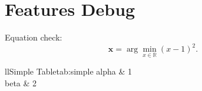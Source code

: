 \documentclass[12pt]{article}
\begin{document}
\section{Features Debug}

Equation check:
\[
  \bm{x} = \arg\min_{x \in \mathbb{R}} (x - 1)^2.
\]

\begin{TableBook}{ll}{Simple Table}{tab:simple}
  alpha & 1 \\
  beta & 2 \\
\end{TableBook}
\end{document}
